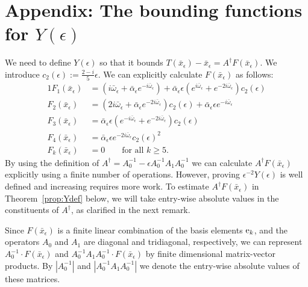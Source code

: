 

\section{Appendix: The bounding functions for $Y(\epsilon)$}
\label{sec:YBoundingFunctions}

We need to define $Y(\epsilon)$ so that it bounds $ T(\bar{x}_\epsilon) -\bar{x}_\epsilon = A^{\dagger} F(\bar{x}_\epsilon)$. 
We introduce $c_2(\epsilon) := \frac{2-i}{5} \epsilon$. 
We can explicitly calculate $F(\bar{x}_\epsilon)$ as follows:
\begin{alignat*}{1}
	F_1( \bar{x}_\epsilon) &=
	( i \bar{\omega}_\epsilon + \bar{\alpha}_\epsilon e^{-i \bar{\omega}_\epsilon}) + 
	\bar{\alpha}_\epsilon \epsilon ( e^{i \bar{\omega}_\epsilon} + e^{-2 i \bar{\omega}_\epsilon}) c_2( \epsilon) \\
	F_2( \bar{x}_\epsilon) &= 
	( 2 i \bar{\omega}_\epsilon + \bar{\alpha}_\epsilon e^{- 2 i \bar{\omega}_\epsilon}) c_2( \epsilon)+ 
	\bar{\alpha}_\epsilon \epsilon  e^{ -i \bar{\omega}_\epsilon} \\
	F_3( \bar{x}_\epsilon) &= \bar{\alpha}_\epsilon \epsilon ( e^{- i \bar{\omega}_\epsilon} + e^{-2 i \bar{\omega}_\epsilon}) c_2( \epsilon) \\
	F_4(\bar{x}_\epsilon) &=  \bar{\alpha}_\epsilon \epsilon  e^{-2 i \bar{\omega}_\epsilon} c_2( \epsilon)^2 \\
	F_{k}(\bar{x}_\epsilon) &=  0 \qquad\text{for all } k\geq 5.
\end{alignat*}
By using the definition of $ A^{\dagger} = A_{0}^{-1} - \epsilon A_{0}^{-1} A_1 A_{0}^{-1} $ we can calculate $A^{\dagger} F(\bar{x}_\epsilon)$ explicitly using a finite number of operations.  
However, proving $ \epsilon^{-2} Y (\epsilon) $ is well defined and increasing requires more work.  
To estimate $A^{\dagger} F(\bar{x}_\epsilon)$ in Theorem~\ref{prop:Ydef} below, we will take entry-wise absolute values in the constituents of $A^{\dagger}$, as clarified in the next remark.
\begin{remark}
 Since $F(\bar{x}_\epsilon)$ is a finite linear combination of the basis elements $\mathrm{e}_k$, and the operators $A_0$ and $A_1$ are diagonal and tridiagonal, respectively,  we can represent $A_0^{-1} \cdot F(\bar{x}_\epsilon)$ and $A_{0}^{-1} A_1 A_0^{-1} \cdot F(\bar{x}_\epsilon)$ by finite dimensional matrix-vector products. 
 By $|A_0^{-1}|$ and $|A_{0}^{-1} A_1 A_0^{-1} |$ we denote the entry-wise absolute values of these matrices. 
\end{remark}

